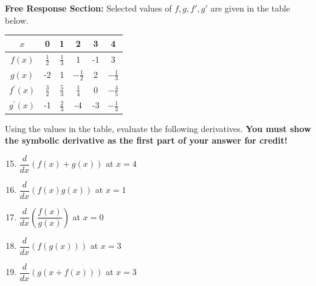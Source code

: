 \documentclass{article}
\begin{document}
	\begin{minipage}[t]{\linewidth}
		\textbf{Free Response Section:} Selected values of \(f, g, f', g'\) are given in the table below. \\
		\renewcommand{\arraystretch}{2}

			\begin{center}
				\begin{tabular}{|c|c|c|c|c|c|}
				\hline
				$x$ & 0 & 1 & 2 & 3 & 4 \\
				\hline
				$f(x)$ & $\frac{1}{2}$ & $\frac{1}{3}$ & 1 & -1 & 3 \\[0.5em]
				\hline
				$g(x)$ & -2 & 1 & $-\frac{1}{2}$ & 2 & $-\frac{1}{3}$ \\
				\hline
				$f^{\prime}(x)$ & $\frac{3}{2}$ & $\frac{5}{3}$ & $\frac{1}{4}$ & 0 & $-\frac{4}{5}$ \\
				\hline
				$g^{\prime}(x)$ & -1 & $\frac{2}{3}$ & -4 & -3 & $-\frac{1}{3}$ \\
				\hline
				\end{tabular}
				\end{center}
			\vspace{2em}
			Using the values in the table, evaluate the following derivatives. \textbf{You
			must show the symbolic derivative as the first part of your answer for credit!}\\[0.1em]
					\begin{enumerate}
					\setcounter{enumi}{14}
					\itemsep1em
					  \item  $\dfrac{d}{dx} \left( f(x) + g(x) \right)$ at $x=4$ \vspace{0.9in}
						\item  $\dfrac{d}{dx} \left( f(x)g(x) \right)$ at $x = 1$ \vspace{0.9in}
						\item  $\dfrac{d}{dx} \left( \dfrac{f(x)}{g(x)} \right)$ at $x = 0$ \vspace{0.9in}
						\item  $\dfrac{d}{dx} \left( f(g(x)) \right)$ at $x = 3$ \vspace{0.9in}
						\item  $\dfrac{d}{dx} \left( g(x+f(x)) \right)$ at $x = 3$ \vspace{0.9in}
					\end{enumerate}
				\end{minipage}
\end{document}
